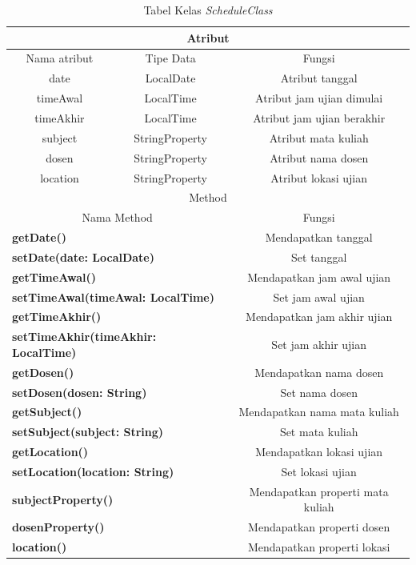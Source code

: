 \begin{table}[H]
	\centering
		\caption{Tabel Kelas \textit{ScheduleClass}}
		\label{tab:schedule_class}
		\begin{tabular}{ | c | c | c |}
			\hline
				\multicolumn{3}{|c|}{Atribut} \\ \hline 
				Nama atribut & Tipe Data  & Fungsi \\ \hline
				date & LocalDate & Atribut tanggal\\ \hline
				timeAwal & LocalTime & Atribut jam ujian dimulai\\ \hline
				timeAkhir & LocalTime & Atribut jam ujian berakhir\\ \hline
				subject & StringProperty & Atribut mata kuliah\\ \hline
				dosen & StringProperty & Atribut nama dosen\\ \hline
				location & StringProperty & Atribut lokasi ujian\\ \hline
				\multicolumn{3}{|c|}{Method} \\ \hline
				\multicolumn{2}{|c|}{Nama Method} & Fungsi \\ \hline
				\multicolumn{2}{|l|}{\textbf{getDate()}} & Mendapatkan tanggal\\ \hline
				\multicolumn{2}{|l|}{\textbf{setDate(date: LocalDate)}} & Set tanggal \\ \hline
				\multicolumn{2}{|l|}{\textbf{getTimeAwal()}} & Mendapatkan jam awal ujian \\ \hline
				\multicolumn{2}{|l|}{\textbf{setTimeAwal(timeAwal: LocalTime)}} & Set jam awal ujian\\ \hline
				\multicolumn{2}{|l|}{\textbf{getTimeAkhir()}} & Mendapatkan jam akhir ujian\\ \hline
				\multicolumn{2}{|l|}{\textbf{setTimeAkhir(timeAkhir: LocalTime)}} & Set jam akhir ujian\\ \hline
				\multicolumn{2}{|l|}{\textbf{getDosen()}} & Mendapatkan nama dosen\\ \hline
				\multicolumn{2}{|l|}{\textbf{setDosen(dosen: String)}} & Set nama dosen\\ \hline
				\multicolumn{2}{|l|}{\textbf{getSubject()}} & Mendapatkan nama mata kuliah\\ \hline
				\multicolumn{2}{|l|}{\textbf{setSubject(subject: String)}}& Set mata kuliah \\ \hline
				\multicolumn{2}{|l|}{\textbf{getLocation()}} & Mendapatkan lokasi ujian\\ \hline
				\multicolumn{2}{|l|}{\textbf{setLocation(location: String)}} & Set lokasi ujian\\ \hline
				\multicolumn{2}{|l|}{\textbf{subjectProperty()}} & Mendapatkan properti mata kuliah\\ \hline
				\multicolumn{2}{|l|}{\textbf{dosenProperty()}} & Mendapatkan properti dosen\\ \hline
				\multicolumn{2}{|l|}{\textbf{location()}} & Mendapatkan properti lokasi\\ \hline
		\end{tabular}
\end{table}

